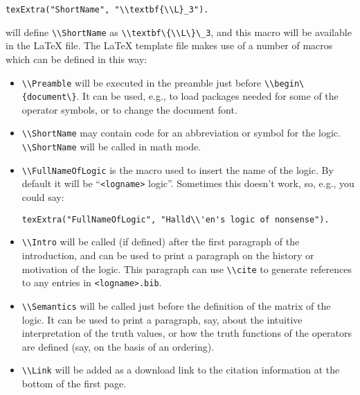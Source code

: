 \documentclass[
]{article}
\newcommand{\passthrough}[1]{#1}
\begin{document}
\begin{itemize}
\begin{lstlisting}
texExtra("ShortName", "\\textbf{\\L}_3").
\end{lstlisting}

  will define \passthrough{\lstinline!\\ShortName!} as
  \passthrough{\lstinline!\\textbf\{\\L\}\_3!}, and this macro will be
  available in the LaTeX file. The LaTeX template file makes use of a
  number of macros which can be defined in this way:

  \begin{itemize}
  \item
    \passthrough{\lstinline!\\Preamble!} will be executed in the
    preamble just before \passthrough{\lstinline!\\begin\{document\}!}.
    It can be used, e.g., to load packages needed for some of the
    operator symbols, or to change the document font.
  \item
    \passthrough{\lstinline!\\ShortName!} may contain code for an
    abbreviation or symbol for the logic.
    \passthrough{\lstinline!\\ShortName!} will be called in math mode.
  \item
    \passthrough{\lstinline!\\FullNameOfLogic!} is the macro used to
    insert the name of the logic. By default it will be
    ``\passthrough{\lstinline!<logname>!} logic''. Sometimes this
    doesn't work, so, e.g., you could say:

\begin{lstlisting}
texExtra("FullNameOfLogic", "Halld\\'en's logic of nonsense").
\end{lstlisting}
  \item
    \passthrough{\lstinline!\\Intro!} will be called (if defined) after
    the first paragraph of the introduction, and can be used to print a
    paragraph on the history or motivation of the logic. This paragraph
    can use \passthrough{\lstinline!\\cite!} to generate references to
    any entries in \passthrough{\lstinline!<logname>.bib!}.
  \item
    \passthrough{\lstinline!\\Semantics!} will be called just before the
    definition of the matrix of the logic. It can be used to print a
    paragraph, say, about the intuitive interpretation of the truth
    values, or how the truth functions of the operators are defined
    (say, on the basis of an ordering).
  \item
    \passthrough{\lstinline!\\Link!} will be added as a download link to
    the citation information at the bottom of the first page.
  \end{itemize}
\end{itemize}
\end{document}
